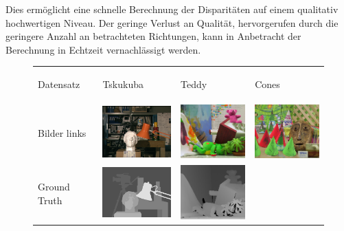 \noindent
Dies ermöglicht eine schnelle Berechnung der Disparitäten auf einem qualitativ hochwertigen Niveau. Der geringe Verlust an Qualität, hervorgerufen durch die geringere Anzahl an betrachteten Richtungen, kann in Anbetracht der Berechnung in Echtzeit vernachlässigt werden.\\

\begin{figure}[h]
\centering
	\begin{tabular}{m{2cm} m{3.3cm} m{3.3cm} m{3.3cm}}
	{\scriptsize Datensatz}&
	\begin{center} {\scriptsize Tskukuba} \end{center} &
	\begin{center} {\scriptsize Teddy} \end{center} &
	\begin{center} {\scriptsize Cones} \end{center}
	\\
	{\scriptsize Bilder links} &
	\includegraphics[width=3cm]{img/disparity_images/left_tsukuba.png} & 
	\includegraphics[width=3cm]{img/disparity_images/left_teddy.png} & 
	\includegraphics[width=3cm]{img/disparity_images/left_cones.png} 
	\\ 
	{\scriptsize Ground Truth} &
	\includegraphics[width=3cm]{img/disparity_images/gt_tsukuba.png} & 
	\includegraphics[width=3cm]{img/disparity_images/gt_teddy.png} & 

\end{tabular}
\end{figure}

